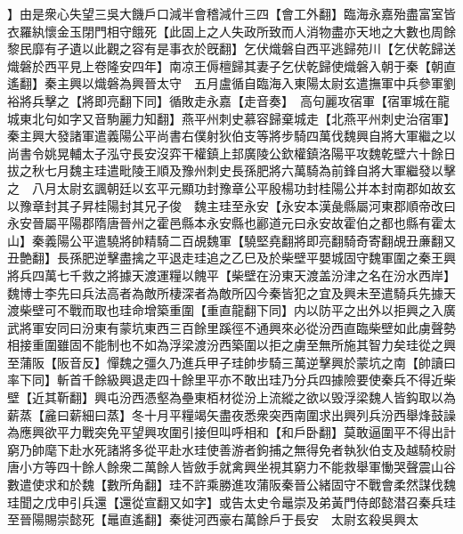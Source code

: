 】由是衆心失望三吳大饑戶口減半會稽減什三四【會工外翻】臨海永嘉殆盡富室皆衣羅紈懷金玉閉門相守餓死【此固上之人失政所致而人消物盡亦天地之大數也周餘黎民靡有孑遺以此觀之容有是事衣於旣翻】乞伏熾磐自西平逃歸苑川【乞伏乾歸送熾磐於西平見上卷隆安四年】南凉王傉檀歸其妻子乞伏乾歸使熾磐入朝于秦【朝直遙翻】秦主興以熾磐為興晉太守　五月盧循自臨海入東陽太尉玄遣撫軍中兵參軍劉裕將兵擊之【將即亮翻下同】循敗走永嘉【走音奏】　高句麗攻宿軍【宿軍城在龍城東北句如字又音駒麗力知翻】燕平州刺史慕容歸棄城走【北燕平州刺史治宿軍】　秦主興大發諸軍遣義陽公平尚書右僕射狄伯支等將步騎四萬伐魏興自將大軍繼之以尚書令姚晃輔太子泓守長安沒弈干權鎮上邽廣陵公欽權鎮洛陽平攻魏乾壁六十餘日拔之秋七月魏主珪遣毗陵王順及豫州刺史長孫肥將六萬騎為前鋒自將大軍繼發以擊之　八月太尉玄諷朝廷以玄平元顯功封豫章公平殷楊功封桂陽公并本封南郡如故玄以豫章封其子昇桂陽封其兄子俊　魏主珪至永安【永安本漢彘縣屬河東郡順帝改曰永安晉屬平陽郡隋唐晉州之霍邑縣本永安縣也酈道元曰永安故霍伯之都也縣有霍太山】秦義陽公平遣驍將帥精騎二百覘魏軍【驍堅堯翻將即亮翻騎奇寄翻覘丑亷翻又丑艶翻】長孫肥逆擊盡擒之平退走珪追之乙巳及於柴壁平嬰城固守魏軍圍之秦王興將兵四萬七千救之將據天渡運糧以餽平【柴壁在汾東天渡盖汾津之名在汾水西岸】魏博士李先曰兵法高者為敵所棲深者為敵所囚今秦皆犯之宜及興未至遣騎兵先據天渡柴壁可不戰而取也珪命增築重圍【重直龍翻下同】内以防平之出外以拒興之入廣武將軍安同曰汾東有蒙坑東西三百餘里蹊徑不通興來必從汾西直臨柴壁如此虜聲勢相接重圍雖固不能制也不如為浮梁渡汾西築圍以拒之虜至無所施其智力矣珪從之興至蒲阪【阪音反】憚魏之彊久乃進兵甲子珪帥步騎三萬逆擊興於蒙坑之南【帥讀曰率下同】斬首千餘級興退走四十餘里平亦不敢出珪乃分兵四據險要使秦兵不得近柴壁【近其靳翻】興屯汾西憑壑為壘東栢材從汾上流縱之欲以毁浮梁魏人皆鈎取以為薪蒸【麄曰薪細曰蒸】冬十月平糧竭矢盡夜悉衆突西南圍求出興列兵汾西舉烽鼓譟為應興欲平力戰突免平望興攻圍引接但叫呼相和【和戶卧翻】莫敢逼圍平不得出計窮乃帥麾下赴水死諸將多從平赴水珪使善游者鉤捕之無得免者執狄伯支及越騎校尉唐小方等四十餘人餘衆二萬餘人皆斂手就禽興坐視其窮力不能救舉軍慟哭聲震山谷數遣使求和於魏【數所角翻】珪不許乘勝進攻蒲阪秦晉公緒固守不戰會柔然謀伐魏珪聞之戊申引兵還【還從宣翻又如字】或告太史令鼂崇及弟黃門侍郎懿潜召秦兵珪至晉陽賜崇懿死【鼂直遙翻】秦徙河西豪右萬餘戶于長安　太尉玄殺吳興太

